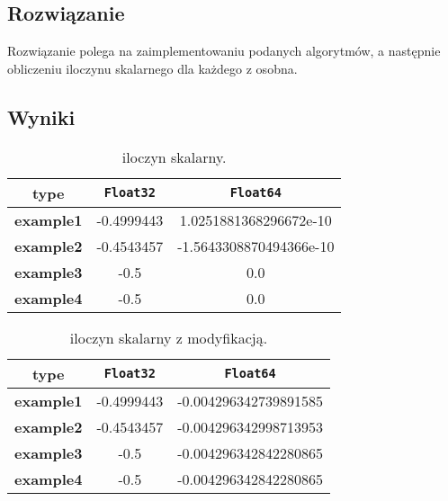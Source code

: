 \documentclass{article}
\begin{document}
\begin{center}
    \subsection{Rozwiązanie}
    \large Rozwiązanie polega na zaimplementowaniu podanych algorytmów, a następnie obliczeniu iloczynu skalarnego dla każdego z osobna.
    \subsection{Wyniki}

    \begin{table}[h!]
    \centering
    \begin{tabular}{||c c c||} 
    \hline
    \textbf{type} & \texttt{Float32} & \texttt{Float64} \\ [0.5ex]
    \hline\hline
    \textbf{example1} & -0.4999443 & 1.0251881368296672e-10 \\ 
    \textbf{example2} & -0.4543457 & -1.5643308870494366e-10 \\ 
    \textbf{example3} & -0.5 & 0.0 \\ 
    \textbf{example4} & -0.5 & 0.0 \\ 
    \hline
    \end{tabular}
    \caption{iloczyn skalarny.}
    \label{table:1}
    \end{table}
     
    \begin{table}[h!]
    \centering
    \begin{tabular}{||c c c||} 
    \hline
    \textbf{type} & \texttt{Float32} & \texttt{Float64} \\ [0.5ex]
    \hline\hline
    \textbf{example1} & -0.4999443 & -0.004296342739891585 \\ 
    \textbf{example2} & -0.4543457 & -0.004296342998713953 \\ 
    \textbf{example3} & -0.5 & -0.004296342842280865 \\ 
    \textbf{example4} & -0.5 & -0.004296342842280865 \\ 
    \hline
    \end{tabular}
    \caption{iloczyn skalarny z modyfikacją.}
    \label{table:2}
    \end{table}
    \newpage

\end{center}
\end{document}
